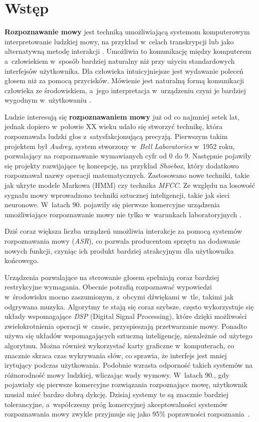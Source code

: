 \newpage %
\section{Wstęp}

\textbf{Rozpoznawanie mowy} jest techniką umożliwiającą systemom komputerowym interpretowanie ludzkiej mowy, na przykład w~celach transkrypcji lub jako alternatywną metodę interakcji \cite{Wiki:Speech}.
Umożliwia to komunikację między komputerem a~człowiekiem w~sposób bardziej naturalny niż przy użyciu standardowych interfejsów użytkownika. Dla człowieka intuicyjniejsze jest wydawanie poleceń głosem niż za pomocą przycisków. Mówienie jest naturalną formą komunikacji człowieka ze środowiskiem, a~jego interpretacja w~urządzeniu czyni je bardziej wygodnym w~użytkowaniu \cite{Elektronika:Speech}.

Ludzie interesują się \textbf{rozpoznawaniem mowy} już od co najmniej setek lat, jednak dopiero w~połowie XX wieku udało się stworzyć technikę, która rozpoznawała ludzki głos z~satysfakcjonującą precyzją. Pierwszym takim projektem był \textit{Audrey}, system stworzony w~\textit{Bell Laboratories} w~1952 roku, pozwalający na rozpoznawanie wymawianych cyfr od 0 do 9. Następnie pojawiły się projekty rozwijające tę koncepcję, na przykład \textit{Shoebox}, który dodatkowo rozpoznawał nazwy operacji matematycznych. Zastosowano nowe techniki, takie jak ukryte modele Markowa (HMM) czy technika \textit{MFCC}. Ze względu na losowość sygnału mowy wprowadzono techniki sztucznej inteligencji, takie jak sieci neuronowe. W~latach 90. pojawiły się pierwsze komercyjne urządzenia umożliwiające rozpoznawanie mowy nie tylko w~warunkach laboratoryjnych \cite{Transcribe:Speech}.

Dziś coraz większa liczba urządzeń umożliwia interakcje za pomocą systemów rozpoznawania mowy (\textit{ASR}), co pozwala producentom sprzętu na dodawanie nowych funkcji, czyniąc ich produkt bardziej atrakcyjnym dla użytkownika końcowego.

Urządzenia pozwalające na sterowanie głosem spełniają coraz bardziej restrykcyjne wymagania. Obecnie potrafią rozpoznawać wypowiedzi w~środowisku mocno zaszumionym, z~obcymi dźwiękami w~tle, takimi jak odgrywana muzyka. Algorytmy te stają się coraz szybsze, często wykorzystuje się układy wspomagające \textit{DSP} (Digital Signal Processing), które dzięki możliwości zwielokrotnienia operacji w~czasie, przyspieszają przetwarzanie mowy. Ponadto używa się układów wspomagających sztuczną inteligencję, niezależnie od użytego algorytmu. Można również wykorzystać karty graficzne w~komputerach, co znacznie skraca czas wykrywania słów, co sprawia, że interfejs jest mniej irytujący podczas użytkowania. Podobnie wzrasta odporność takich systemów na różnorodność mowy ludzkiej, wliczając wady wymowy. W~latach 90., gdy pojawiały się pierwsze komercyjne rozwiązania rozpoznające mowę, użytkownik musiał mieć bardzo dobrą dykcję. Dzisiaj systemy te są znacznie bardziej tolerancyjne, a~współczesny próg komercyjnej akceptowalności systemów rozpoznawania mowy zwykle przyjmuje się jako 95\% poprawności rozpoznania~\cite{Ziolko:Speech}.

